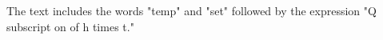 The text includes the words "temp" and "set" followed by the expression "Q subscript on of h times t."
